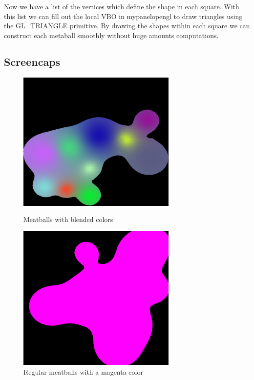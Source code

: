 \documentclass{article}
\begin{document}
Now we have a list of the vertices which define the shape in each square. With this list we can fill out the local VBO in mypanelopengl to draw triangles using the GL\_TRIANGLE primitive. By drawing the shapes within each square we can construct each metaball smoothly without huge amounts computations. 

\subsection*{Screencaps}


\begin{figure}[h]
\centering
\begin{minipage}{.5\textwidth}
  \centering
  \includegraphics[width=0.7\textwidth]{colormeatballs}
  \caption{Meatballs with blended colors}
\end{minipage}%
\begin{minipage}{.5\textwidth}
  \centering
  \includegraphics[width=0.7\textwidth]{metaballs}
  \caption{Regular meatballs with a magenta color}
\end{minipage}
\end{figure}
\end{document}
